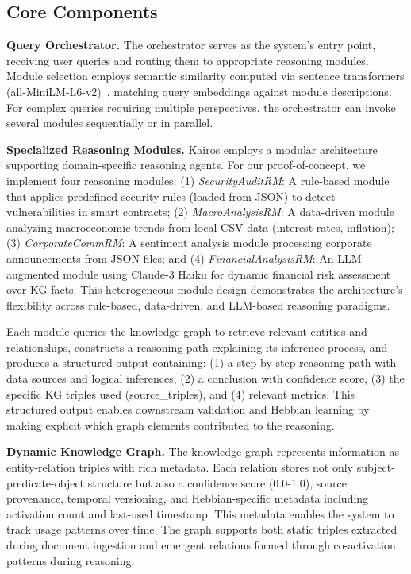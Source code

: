 \documentclass{article}
\begin{document}
\subsection{Core Components}

\textbf{Query Orchestrator.} The orchestrator serves as the system's entry point, receiving user queries and routing them to appropriate reasoning modules. Module selection employs semantic similarity computed via sentence transformers (all-MiniLM-L6-v2)~\citep{reimers2019sentencebert}, matching query embeddings against module descriptions. For complex queries requiring multiple perspectives, the orchestrator can invoke several modules sequentially or in parallel.

\textbf{Specialized Reasoning Modules.} Kairos employs a modular architecture supporting domain-specific reasoning agents. For our proof-of-concept, we implement four reasoning modules: (1) \textit{SecurityAuditRM}: A rule-based module that applies predefined security rules (loaded from JSON) to detect vulnerabilities in smart contracts; (2) \textit{MacroAnalysisRM}: A data-driven module analyzing macroeconomic trends from local CSV data (interest rates, inflation); (3) \textit{CorporateCommRM}: A sentiment analysis module processing corporate announcements from JSON files; and (4) \textit{FinancialAnalysisRM}: An LLM-augmented module using Claude-3 Haiku for dynamic financial risk assessment over KG facts. This heterogeneous module design demonstrates the architecture's flexibility across rule-based, data-driven, and LLM-based reasoning paradigms.

Each module queries the knowledge graph to retrieve relevant entities and relationships, constructs a reasoning path explaining its inference process, and produces a structured output containing: (1) a step-by-step reasoning path with data sources and logical inferences, (2) a conclusion with confidence score, (3) the specific KG triples used (source\_triples), and (4) relevant metrics. This structured output enables downstream validation and Hebbian learning by making explicit which graph elements contributed to the reasoning.

\textbf{Dynamic Knowledge Graph.} The knowledge graph represents information as entity-relation triples with rich metadata. Each relation stores not only subject-predicate-object structure but also a confidence score (0.0-1.0), source provenance, temporal versioning, and Hebbian-specific metadata including activation count and last-used timestamp. This metadata enables the system to track usage patterns over time. The graph supports both static triples extracted during document ingestion and emergent relations formed through co-activation patterns during reasoning.
\end{document}
